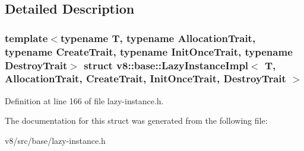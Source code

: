 \subsection{Detailed Description}
\subsubsection*{template$<$typename T, typename Allocation\+Trait, typename Create\+Trait, typename Init\+Once\+Trait, typename Destroy\+Trait$>$\newline
struct v8\+::base\+::\+Lazy\+Instance\+Impl$<$ T, Allocation\+Trait, Create\+Trait, Init\+Once\+Trait, Destroy\+Trait $>$}



Definition at line 166 of file lazy-\/instance.\+h.



The documentation for this struct was generated from the following file\+:\begin{DoxyCompactItemize}
\item 
v8/src/base/lazy-\/instance.\+h\end{DoxyCompactItemize}
